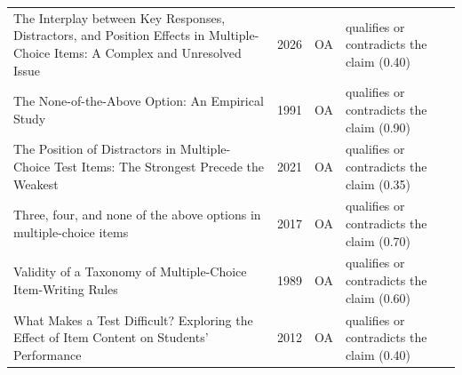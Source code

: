 \begin{longtable}{@{}%
  >{\raggedright\arraybackslash}p{}c%
  >{\raggedright\arraybackslash}p{}%
  >{\raggedright\arraybackslash}p{}@{}}
The Interplay between Key Responses, Distractors, and Position Effects in Multiple-Choice Items: A Complex and Unresolved Issue & 2026 & OA & qualifies or contradicts the claim (0.40) \\
The None-of-the-Above Option: An Empirical Study & 1991 & OA & qualifies or contradicts the claim (0.90) \\
The Position of Distractors in Multiple-Choice Test Items: The Strongest Precede the Weakest & 2021 & OA & qualifies or contradicts the claim (0.35) \\
Three, four, and none of the above options in multiple-choice items & 2017 & OA & qualifies or contradicts the claim (0.70) \\
Validity of a Taxonomy of Multiple-Choice Item-Writing Rules & 1989 & OA & qualifies or contradicts the claim (0.60) \\
What Makes a Test Difficult? Exploring the Effect of Item Content on Students' Performance & 2012 & OA & qualifies or contradicts the claim (0.40) \\
\end{longtable}
\endgroup

